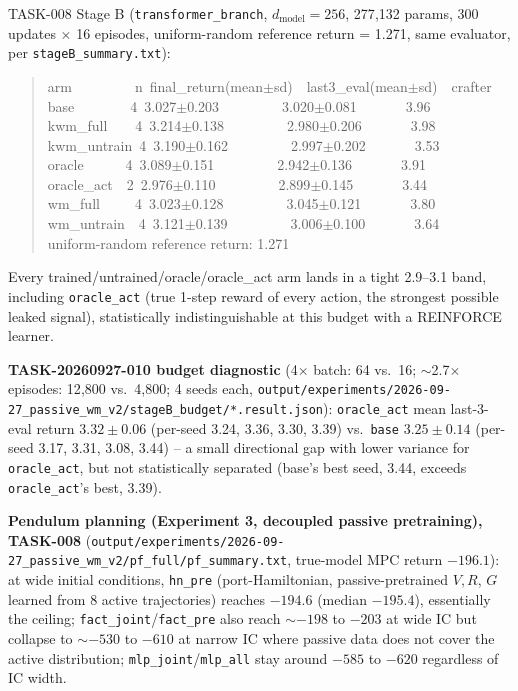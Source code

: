 \documentclass[11pt]{article}
\newcommand{\srcpath}[1]{\texttt{\small #1}}
\begin{document}
TASK-008 Stage B (\texttt{transformer\_branch}, $d_{\text{model}}=256$, 277{,}132 params, 300
updates $\times$ 16 episodes, uniform-random reference return = 1.271, same evaluator, per
\srcpath{stageB\_summary.txt}):
\begin{quote}\small\ttfamily
arm~~~~~~~~~n~final\_return(mean$\pm$sd)~~last3\_eval(mean$\pm$sd)~~crafter\\
base~~~~~~~~4~3.027$\pm$0.203~~~~~~~~~3.020$\pm$0.081~~~~~~~3.96\\
kwm\_full~~~~4~3.214$\pm$0.138~~~~~~~~~2.980$\pm$0.206~~~~~~~3.98\\
kwm\_untrain~4~3.190$\pm$0.162~~~~~~~~~2.997$\pm$0.202~~~~~~~3.53\\
oracle~~~~~~4~3.089$\pm$0.151~~~~~~~~~2.942$\pm$0.136~~~~~~~3.91\\
oracle\_act~~2~2.976$\pm$0.110~~~~~~~~~2.899$\pm$0.145~~~~~~~3.44\\
wm\_full~~~~~4~3.023$\pm$0.128~~~~~~~~~3.045$\pm$0.121~~~~~~~3.80\\
wm\_untrain~~4~3.121$\pm$0.139~~~~~~~~~3.006$\pm$0.100~~~~~~~3.64\\
uniform-random reference return: 1.271
\end{quote}
Every trained/untrained/oracle/oracle\_act arm lands in a tight 2.9--3.1 band, including
\texttt{oracle\_act} (true 1-step reward of every action, the strongest possible leaked signal),
statistically indistinguishable at this budget with a REINFORCE learner.

\textbf{TASK-20260927-010 budget diagnostic} (4$\times$ batch: 64 vs.\ 16; $\sim$2.7$\times$
episodes: 12{,}800 vs.\ 4{,}800; 4 seeds each, \srcpath{output/experiments/2026-09-27\_passive\_wm\_v2/stageB\_budget/*.result.json}):
\texttt{oracle\_act} mean last-3-eval return $3.32\pm0.06$ (per-seed 3.24, 3.36, 3.30, 3.39) vs.\
\texttt{base} $3.25\pm0.14$ (per-seed 3.17, 3.31, 3.08, 3.44) -- a small directional gap with lower
variance for \texttt{oracle\_act}, but not statistically separated (base's best seed, 3.44, exceeds
\texttt{oracle\_act}'s best, 3.39).

\textbf{Pendulum planning (Experiment 3, decoupled passive pretraining), TASK-008}
(\srcpath{output/experiments/2026-09-27\_passive\_wm\_v2/pf\_full/pf\_summary.txt}, true-model MPC
return $-196.1$): at wide initial conditions, \texttt{hn\_pre} (port-Hamiltonian, passive-pretrained
$V,R$, $G$ learned from 8 active trajectories) reaches $-194.6$ (median $-195.4$), essentially the
ceiling; \texttt{fact\_joint}/\texttt{fact\_pre} also reach $\sim -198$ to $-203$ at wide IC but
collapse to $\sim -530$ to $-610$ at narrow IC where passive data does not cover the active
distribution; \texttt{mlp\_joint}/\texttt{mlp\_all} stay around $-585$ to $-620$ regardless of IC
width.
\end{document}
